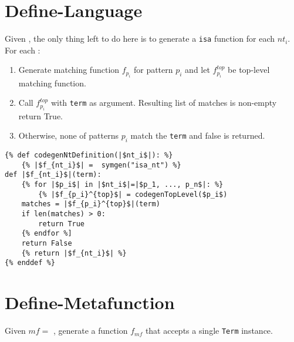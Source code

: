 \section{Define-Language}
Given \DefineLanguage, the only thing left to do here is to generate a \texttt{isa} function for each $nt_i$. For each \NtDefinition:
\begin{enumerate}
\item Generate matching function $f_{p_i}$ for pattern $p_i$ and let $f_{p_i}^{top}$ be top-level matching function. 
\item Call $f_{p_i}^{top}$ with \texttt{term} as argument. Resulting list of matches is non-empty return True. 
\item Otherwise, none of patterns $p_i$ match the \texttt{term} and false is returned.
\end{enumerate}


\begin{verbatim}
{% def codegenNtDefinition(|$nt_i$|): %}
	{% |$f_{nt_i}$| =  symgen("isa_nt") %}
def |$f_{nt_i}$|(term):
	{% for |$p_i$| in |$nt_i$|=|$p_1, ..., p_n$|: %}
		{% |$f_{p_i}^{top}$| = codegenTopLevel($p_i$)
	matches = |$f_{p_i}^{top}$|(term)
	if len(matches) > 0:
		return True
	{% endfor %]
	return False
	{% return |$f_{nt_i}$| %}
{% enddef %}
\end{verbatim}



\section{Define-Metafunction}

Given $mf=$ \DefineMetafunction, generate a function $f_{mf}$ that accepts a single \texttt{Term} instance.

